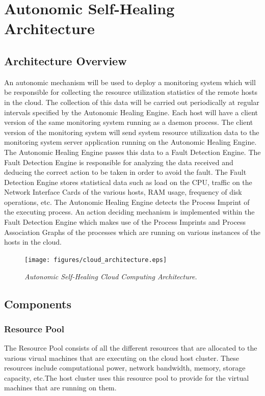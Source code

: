 \chapter{Autonomic Self-Healing Architecture}
\section{Architecture Overview}
An autonomic mechanism will be used to deploy a monitoring system which will be responsible for collecting the resource utilization statistics of the remote hosts in the cloud. The collection of this data will be carried out periodically at regular intervals specified by the Autonomic Healing Engine. Each host will have a client version of the same monitoring system running as a daemon process. The client version of the monitoring system will send system resource utilization data to the monitoring system server application running on the Autonomic Healing Engine. The Autonomic Healing Engine  passes this data to a Fault Detection Engine. The Fault Detection Engine is responsible for analyzing the data received and deducing the correct action to be taken in order to avoid the fault. The Fault Detection Engine stores statistical data such as load on the CPU, traffic on the Network Interface Cards of the various hosts, RAM usage, frequency of disk operations, etc. The Autonomic Healing Engine detects the Process Imprint of the executing process. An action deciding mechanism is implemented within the Fault Detection Engine which makes use of the Process Imprints and Process Association Graphs of the processes which are running on various instances of the hosts in the cloud.
	\begin{figure}[t]
		\begin{center}
			\texttt{[image: figures/cloud\_architecture.eps]} 
			\caption{\small \sl Autonomic Self-Healing Cloud Computing Architecture.\label{fig:Label6}} 
		\end{center} 
	\end{figure}
\section{Components}
\subsection{Resource Pool}
The Resource Pool consists of all the different resources that are allocated to the various virual machines that are executing on the cloud host cluster. These resources include computational power, network bandwidth, memory, storage capacity, etc.The host cluster uses this resource pool to provide for the virtual machines that are running on them.
